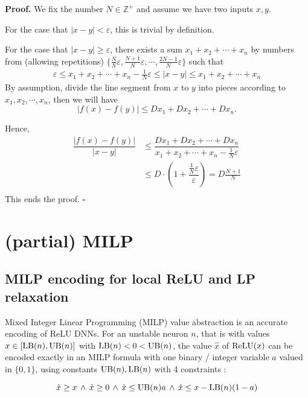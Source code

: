 	\textbf{Proof.}
	We fix the number $N\in\mathbb{Z}^+$ and assume we have two inputs $x, y$.
	
	For the case that $|x-y|<\varepsilon$, this is trivial by definition.
	
	For the case that $|x-y|\geq \varepsilon$, there exists a sum $x_1+x_2+\cdots+x_n$ by numbers from (allowing repetitions) $\{\frac{N}{N}\varepsilon,\frac{N+1}{N}\varepsilon,\cdots, \frac{2N-1}{N}\varepsilon\}$ such that \begin{align*}
		\varepsilon \leq x_1+x_2+\cdots+x_n -\frac{1}{N}\varepsilon \leq |x-y| \leq x_1+x_2+\cdots+x_n
	\end{align*}
	By assumption, divide the line segment from $x$ to $y$ into pieces according to $x_1, x_2,\cdots,x_n$, then we will have $$|f(x)-f(y)|\leq Dx_1+Dx_2+\cdots+Dx_n.$$
	
	Hence,\begin{align*}
		\dfrac{|f(x)-f(y)|}{|x-y|} &\leq \dfrac{Dx_1+Dx_2+\cdots+Dx_n}{x_1+x_2+\cdots+x_n -\frac{1}{N}\varepsilon}\\
		& \leq D\cdot( 1+  \dfrac{\frac{1}{N}\varepsilon}{\varepsilon})= D \frac{N+1}{N}\\
	\end{align*}
	This ends the proof.
	\hfill $\square$
	
	\fi

	
	\section{(partial) MILP}
	
	
	
	\subsection{MILP encoding for local ReLU and LP relaxation}
	
	Mixed Integer Linear Programming (MILP) value abstraction is an accurate encoding of ReLU DNNs. For an unstable neuron $n$, that is with values 
    $x \in [\mathrm{LB}(n),\mathrm{UB}(n)]$ with $\mathrm{LB}(n)<0<\mathrm{UB}(n)$, 
    the value $\hat{x}$ of $\mathrm{ReLU}(x)$ can be encoded exactly in an MILP formula with one binary / integer variable $a$ valued in $\{0,1\}$, using constants $\mathrm{UB}(n),\mathrm{LB}(n)$ with 4 constraints \cite{MILP}:
	
	\vspace{-0.4cm}
	\begin{equation} 
        \hat{x} \geq x \, \wedge \, \hat{x} \geq 0 \, \wedge \, \hat{x} \leq \mathrm{UB}(n) a \, \wedge \, \hat{x} \leq x-\mathrm{LB}(n) (1-a)
		\label{eq11}
	\end{equation}
	
